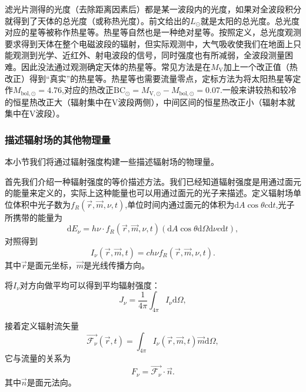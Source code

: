 \documentclass[../天体物理基础.tex]{subfiles}
\begin{document}
滤光片测得的光度（去除距离因素后）都是某一波段内的光度，如果对全波段积分就得到了天体的总光度（或称热光度）。前文给出的$L_{\odot}$就是太阳的总光度。总光度对应的星等被称作热星等。热星等自然也是一种绝对星等。按照定义，总光度观测要求得到天体在整个电磁波段的辐射，但实际观测中，大气吸收使我们在地面上只能观测到光学、近红外、射电波段的信号，同时强度也有所减弱，全波段测量困难。因此没法通过观测确定天体的热星等。常见方法是在$M_{\text{V}}$加上一个改正值（热改正）得到“真实”的热星等。热星等也需要流量零点，定标方法为将太阳热星等定作$M_{\mathrm{bol},\odot}=4.76$,对应的热改正$\mathrm{BC}_{\odot}=M_{\mathrm{V},\odot}-M_{\mathrm{bol},\odot}=0.07$.一般来讲较热和较冷的恒星热改正大（辐射集中在V波段两侧），中间区间的恒星热改正小（辐射本就集中在V波段）。

\subsubsection{描述辐射场的其他物理量}
本小节我们将通过辐射强度构建一些描述辐射场的物理量。

首先我们介绍一种辐射强度的等价描述方法。我们已经知道辐射强度是用通过面元的能量来定义的，实际上这种能量也可以用通过面元的光子来描述。定义辐射场单位体积中光子数为$f_{R}\left(\vec{r},\vec{m},\nu,t\right)$,单位时间内通过面元的体积为$\mathrm{d}A\cos\theta c\mathrm{d}t$,光子所携带的能量为
\begin{equation}
\mathrm{d}E_{\nu}=h\nu\cdot f_{R}\left(\vec{r},\vec{m},\nu,t\right)\left(\mathrm{d}A\cos\theta\mathrm{d}\Omega\mathrm{d}\nu c\mathrm{d}t\right),
\end{equation}
对照得到
\begin{equation}
I_{\nu}\left(\vec{r},\vec{m},t\right)=ch\nu f_{R}\left(\vec{r},\vec{m},\nu,t\right).
\end{equation}
其中$\vec{r}$是面元坐标，$\vec{m}$是光线传播方向。

将$I_{\nu}$对方向做平均可以得到平均辐射强度：
\begin{equation}
J_{\nu}=\frac1{4\pi}\int_{4\pi}I_{\nu}\mathrm{d}\Omega,
\end{equation}

接着定义辐射流矢量
\begin{equation}
\vec{\mathcal{F}_{\nu}}(\vec{r},t)=\int_{4\pi}I_{\nu}\left(\vec{r},\vec{m},t\right)\vec{m}\mathrm{d}\Omega,
\end{equation}
它与流量的关系为
\begin{equation}
F_{\nu}=\vec{\mathcal{F}_{\nu}}\cdot\vec{n}.
\end{equation}
其中$\vec{n}$是面元法向。
\end{document}
